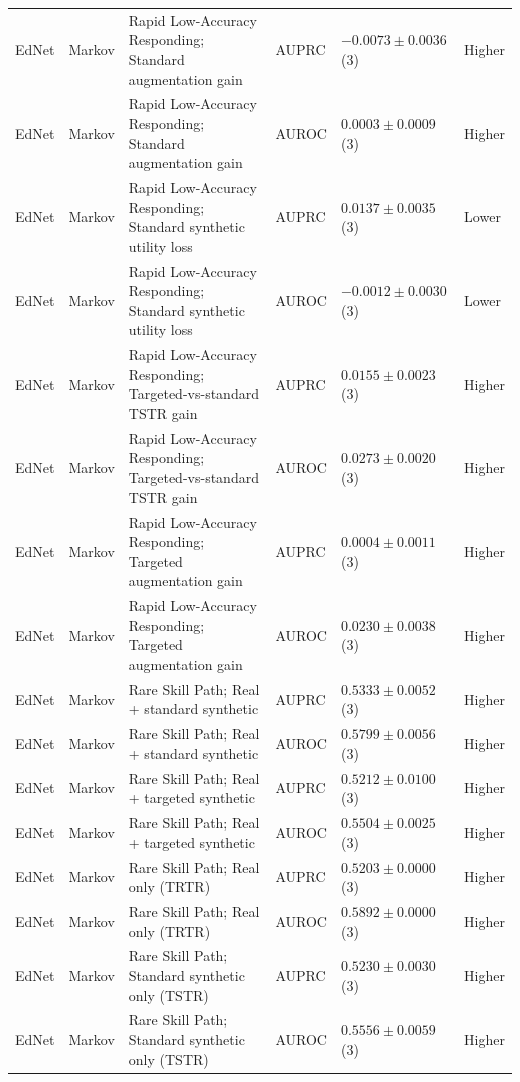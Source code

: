 \begin{longtable}{@{}p{2.25cm}p{2.05cm}p{4.7cm}p{5.0cm}p{2.6cm}p{1.25cm}@{}}
EdNet & Markov & Rapid Low-Accuracy Responding; Standard augmentation gain & AUPRC & $-0.0073 \mathbin{\pm} 0.0036$ (3) & Higher \\
EdNet & Markov & Rapid Low-Accuracy Responding; Standard augmentation gain & AUROC & $0.0003 \mathbin{\pm} 0.0009$ (3) & Higher \\
EdNet & Markov & Rapid Low-Accuracy Responding; Standard synthetic utility loss & AUPRC & $0.0137 \mathbin{\pm} 0.0035$ (3) & Lower \\
EdNet & Markov & Rapid Low-Accuracy Responding; Standard synthetic utility loss & AUROC & $-0.0012 \mathbin{\pm} 0.0030$ (3) & Lower \\
EdNet & Markov & Rapid Low-Accuracy Responding; Targeted-vs-standard TSTR gain & AUPRC & $0.0155 \mathbin{\pm} 0.0023$ (3) & Higher \\
EdNet & Markov & Rapid Low-Accuracy Responding; Targeted-vs-standard TSTR gain & AUROC & $0.0273 \mathbin{\pm} 0.0020$ (3) & Higher \\
EdNet & Markov & Rapid Low-Accuracy Responding; Targeted augmentation gain & AUPRC & $0.0004 \mathbin{\pm} 0.0011$ (3) & Higher \\
EdNet & Markov & Rapid Low-Accuracy Responding; Targeted augmentation gain & AUROC & $0.0230 \mathbin{\pm} 0.0038$ (3) & Higher \\
EdNet & Markov & Rare Skill Path; Real + standard synthetic & AUPRC & $0.5333 \mathbin{\pm} 0.0052$ (3) & Higher \\
EdNet & Markov & Rare Skill Path; Real + standard synthetic & AUROC & $0.5799 \mathbin{\pm} 0.0056$ (3) & Higher \\
EdNet & Markov & Rare Skill Path; Real + targeted synthetic & AUPRC & $0.5212 \mathbin{\pm} 0.0100$ (3) & Higher \\
EdNet & Markov & Rare Skill Path; Real + targeted synthetic & AUROC & $0.5504 \mathbin{\pm} 0.0025$ (3) & Higher \\
EdNet & Markov & Rare Skill Path; Real only (TRTR) & AUPRC & $0.5203 \mathbin{\pm} 0.0000$ (3) & Higher \\
EdNet & Markov & Rare Skill Path; Real only (TRTR) & AUROC & $0.5892 \mathbin{\pm} 0.0000$ (3) & Higher \\
EdNet & Markov & Rare Skill Path; Standard synthetic only (TSTR) & AUPRC & $0.5230 \mathbin{\pm} 0.0030$ (3) & Higher \\
EdNet & Markov & Rare Skill Path; Standard synthetic only (TSTR) & AUROC & $0.5556 \mathbin{\pm} 0.0059$ (3) & Higher \\

\end{longtable}
